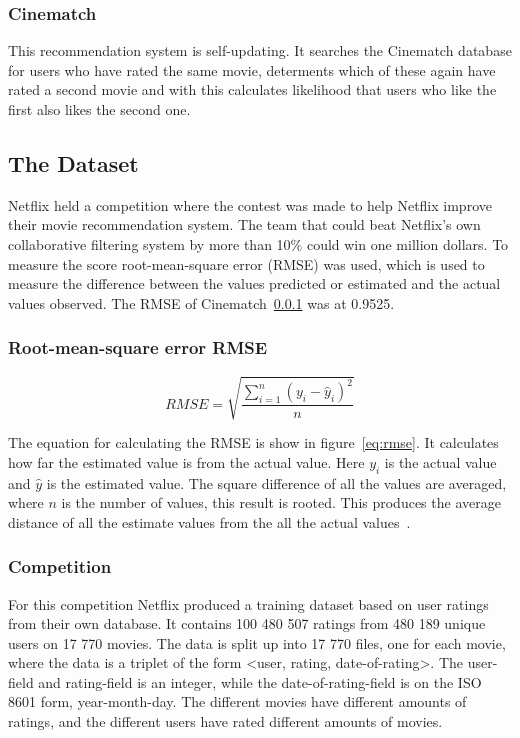 \subsubsection{Cinematch}
\label{subsec:Cinematch}
This recommendation system is self-updating. It searches the Cinematch database for users who have rated the same movie, determents which of these again have rated a second movie and with this calculates likelihood that users who like the first also likes the second one.


\subsection{The Dataset}\label{subsec:netflixdata}
Netflix held a competition where the contest was made to help Netflix improve their movie recommendation system. The team that could beat Netflix's own collaborative filtering system by more than 10\% could win one million dollars. To measure the score root-mean-square error (RMSE) was used, which is used to measure the difference between the values predicted or estimated and the actual values observed. The RMSE of Cinematch~\ref{subsec:Cinematch} was at 0.9525.

\subsubsection{Root-mean-square error RMSE}\label{subsubsec:rmse}

\begin{equation}\label{eq:rmse}
RMSE = \sqrt {{\frac{{\sum\limits_{{i = 1}}^n {{{\left( {{y_i} - {{\hat{y}}_i}} \right)}^2}} }}{{n}}}}
\end{equation}

The equation for calculating the RMSE is show in figure~\ref{eq:rmse}. It calculates how far the estimated value is from the actual value. Here ${y_i}$ is the actual value and ${\hat{y}}$ is the estimated value. The square difference of all the values are averaged, where ${n}$ is the number of values, this result is rooted. This produces the average distance of all the estimate values from the all the actual values~\cite{rmse}.


\subsubsection{Competition}

For this competition Netflix produced a training dataset based on user ratings from their own database. It contains 100 480 507 ratings from 480 189 unique users on 17 770 movies. The data is split up into 17 770 files, one for each movie, where the data is a triplet of the form <user, rating, date-of-rating>. The user-field and rating-field is an integer, while the date-of-rating-field is on the ISO 8601 form, year-month-day. The different movies have different amounts of ratings, and the different users have rated different amounts of movies.

